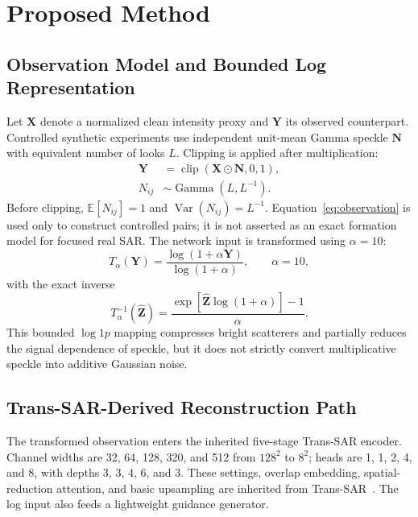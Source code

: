 \documentclass[conference]{IEEEtran}
\newcommand{\vect}[1]{\bm{#1}}
\begin{document}
\section{Proposed Method}
\subsection{Observation Model and Bounded Log Representation}
Let \(\vect{X}\) denote a normalized clean intensity proxy and \(\vect{Y}\) its observed counterpart. Controlled synthetic experiments use independent unit-mean Gamma speckle \(\vect{N}\) with equivalent number of looks \(L\). Clipping is applied after multiplication:
\begin{equation}
\begin{aligned}
\vect{Y} &= \operatorname{clip}(\vect{X}\odot\vect{N},0,1),\\
N_{ij} &\sim \operatorname{Gamma}(L,L^{-1}).
\end{aligned}
\label{eq:observation}
\end{equation}
Before clipping, \(\mathbb{E}[N_{ij}]=1\) and \(\operatorname{Var}(N_{ij})=L^{-1}\). Equation~\eqref{eq:observation} is used only to construct controlled pairs; it is not asserted as an exact formation model for focused real SAR. The network input is transformed using \(\alpha=10\):
\begin{equation}
T_{\alpha}(\vect{Y})=
\frac{\log(1+\alpha\vect{Y})}{\log(1+\alpha)},
\qquad \alpha=10,
\label{eq:log}
\end{equation}
with the exact inverse
\begin{equation}
T_{\alpha}^{-1}(\widehat{\vect{Z}})=
\frac{\exp[\widehat{\vect{Z}}\log(1+\alpha)]-1}{\alpha}.
\label{eq:inverse}
\end{equation}
This bounded \(\log1p\) mapping compresses bright scatterers and partially reduces the signal dependence of speckle, but it does not strictly convert multiplicative speckle into additive Gaussian noise.

\subsection{Trans-SAR-Derived Reconstruction Path}
The transformed observation enters the inherited five-stage Trans-SAR encoder. Channel widths are 32, 64, 128, 320, and 512 from \(128^2\) to \(8^2\); heads are 1, 1, 2, 4, and 8, with depths 3, 3, 4, 6, and 3. These settings, overlap embedding, spatial-reduction attention, and basic upsampling are inherited from Trans-SAR~\cite{perera2022}. The log input also feeds a lightweight guidance generator.
\end{document}
